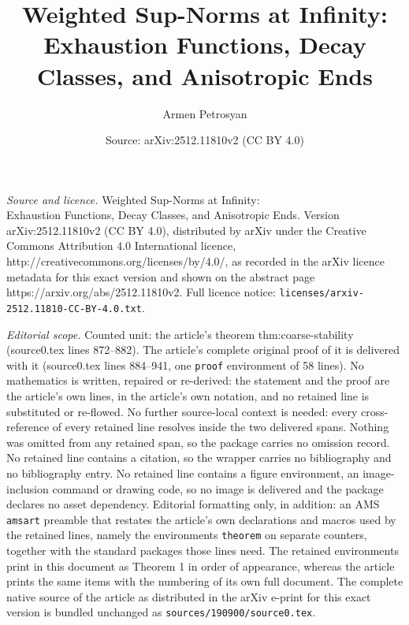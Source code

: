 \documentclass[10pt,a4paper]{amsart}
\title{Weighted Sup-Norms at Infinity:\\ Exhaustion Functions, Decay Classes, and Anisotropic Ends}
\author{Armen Petrosyan}
\date{Source: arXiv:2512.11810v2 (CC BY 4.0)}
\begin{document}
\maketitle

\noindent\emph{Source and licence.} Weighted Sup-Norms at Infinity:\\ Exhaustion Functions, Decay Classes, and Anisotropic Ends. Version arXiv:2512.11810v2 (CC BY 4.0), distributed by arXiv under the Creative Commons Attribution 4.0 International licence, http://creativecommons.org/licenses/by/4.0/, as recorded in the arXiv licence metadata for this exact version and shown on the abstract page https://arxiv.org/abs/2512.11810v2. Full licence notice: \texttt{licenses/arxiv-2512.11810-CC-BY-4.0.txt}.\par\smallskip

\noindent\textit{Editorial scope.} Counted unit: the article's theorem thm:coarse-stability (source0.tex lines 872--882). The article's complete original proof of it is delivered with it (source0.tex lines 884--941, one \texttt{proof} environment of 58 lines). No mathematics is written, repaired or re-derived: the statement and the proof are the article's own lines, in the article's own notation, and no retained line is substituted or re-flowed.  No further source-local context is needed: every cross-reference of every retained line resolves inside the two delivered spans.  Nothing was omitted from any retained span, so the package carries no omission record.  No retained line contains a citation, so the wrapper carries no bibliography and no bibliography entry.  No retained line contains a figure environment, an image-inclusion command or drawing code, so no image is delivered and the package declares no asset dependency.  Editorial formatting only, in addition: an AMS \texttt{amsart} preamble that restates the article's own declarations and macros used by the retained lines, namely the environments \texttt{theorem} on separate counters, together with the standard packages those lines need.  The retained environments print in this document as Theorem 1 in order of appearance, whereas the article prints the same items with the numbering of its own full document.  The complete native source of the article as distributed in the arXiv e-print for this exact version is bundled unchanged as \texttt{sources/190900/source0.tex}.
\end{document}
